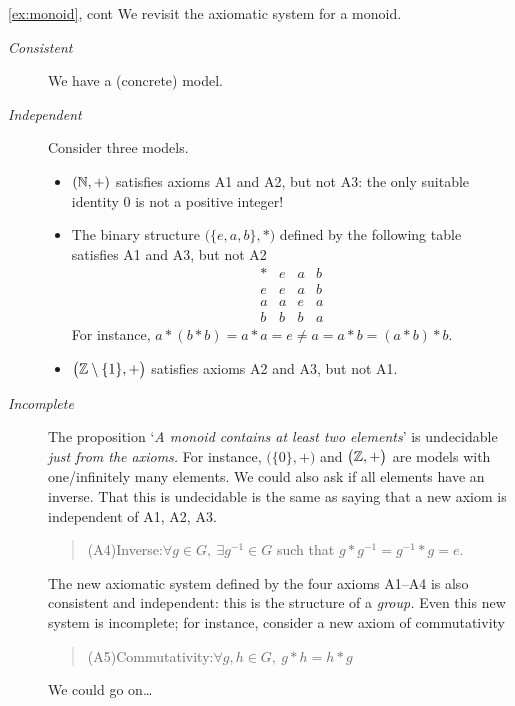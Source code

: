 \begin{example*}{\ref{ex:monoid}, cont}{}
	We revisit the axiomatic system for a monoid.
	\begin{description}
		\item[\normalfont\emph{Consistent}] We have a (concrete) model.
		
 		\item[\normalfont\emph{Independent}] Consider three models.
 		\begin{itemize}
 		  \item $(\mathbb{N},+)$ satisfies axioms A1 and A2, but not A3: the only suitable identity 0 is not a positive integer!
		  \item The binary structure $\big(\{e,a,b\},*\big)$ defined by the following table satisfies A1 and A3, but not A2
		  \[
 		  	\begin{array}{c||ccc}
 		  		*&e&a&b\\\hline\hline
 		  		e&e&a&b\\
 		  		a&a&e&a\\
 		  		b&b&b&a
 		  	\end{array}
		  \]
		  For instance, $a*(b*b)=a*a=e\neq a=a*b=(a*b)*b$.
		  \item $\big(\mathbb{Z}\setminus\{1\},+\big)$ satisfies axioms A2 and A3, but not A1.
 		\end{itemize}
 		
 		\item[\normalfont\emph{Incomplete}] The proposition `\emph{A monoid contains at least two elements}' is undecidable \emph{just from the axioms.} For instance, $\big(\{0\},+\big)$ and $\big(\mathbb{Z},+\big)$ are models with one/infinitely many elements.\smallbreak
 		We could also ask if all elements have an inverse. That this is undecidable is the same as saying that a new axiom is independent of A1, A2, A3.
		\begin{quote}
			(A4)\lstsp Inverse:\quad $\forall g\in G,\ \exists g^{-1}\in G$ such that $g\ast g^{-1}=g^{-1}\ast g=e$.
		\end{quote}
		The new axiomatic system defined by the four axioms A1--A4 is also consistent and independent: this is the structure of a \emph{group.}\smallbreak
		Even this new system is incomplete; for instance, consider a new axiom of commutativity
		\begin{quote}
			(A5)\lstsp Commutativity:\quad $\forall g,h\in G,\ g\ast h=h\ast g$
		\end{quote}
		We could go on\ldots
	\end{description} 
\end{example*}


